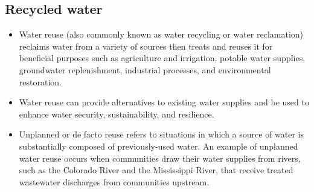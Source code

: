 \subsection{Recycled water}
\begin{itemize}
\item Water reuse (also commonly known as water recycling or water reclamation) reclaims water from a variety of sources then treats and reuses it for beneficial purposes such as agriculture and irrigation, potable water supplies, groundwater replenishment, industrial processes, and environmental restoration.
\item Water reuse can provide alternatives to existing water supplies and be used to enhance water security, sustainability, and resilience.

\item Unplanned or de facto reuse refers to situations in which a source of water is substantially composed of previously-used water. An example of unplanned water reuse occurs when communities draw their water supplies from rivers, such as the Colorado River and the Mississippi River, that receive treated wastewater discharges from communities upstream.
\end{itemize}

